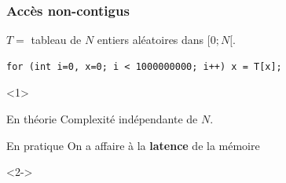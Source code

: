 \documentclass[xcolor={x11names,svgnames}]{beamer}
\begin{document}
\begin{frame}[fragile,label=pointer_jumping]
  \frametitle{Accès non-contigus}

  $T =$ tableau de $N$ entiers aléatoires dans $[0; N[$.

  \smallskip
  
\begin{verbatim}
for (int i=0, x=0; i < 1000000000; i++) x = T[x];
\end{verbatim}
\begin{overlayarea}{\textwidth}{6.5cm}
  \begin{onlyenv}<1>
    \bigskip
    \begin{exampleblock}{En théorie}
      Complexité indépendante de $N$.
    \end{exampleblock}

    \medskip

    \begin{alertblock}{En pratique}
      On a affaire à la \textbf{latence} de la mémoire
    \end{alertblock}

\end{onlyenv}
  \begin{onlyenv}<2->
    \begin{center}
      \vspace{-0.33cm}
    \end{center}
\end{onlyenv}
\end{overlayarea}
\end{frame}
\end{document}
